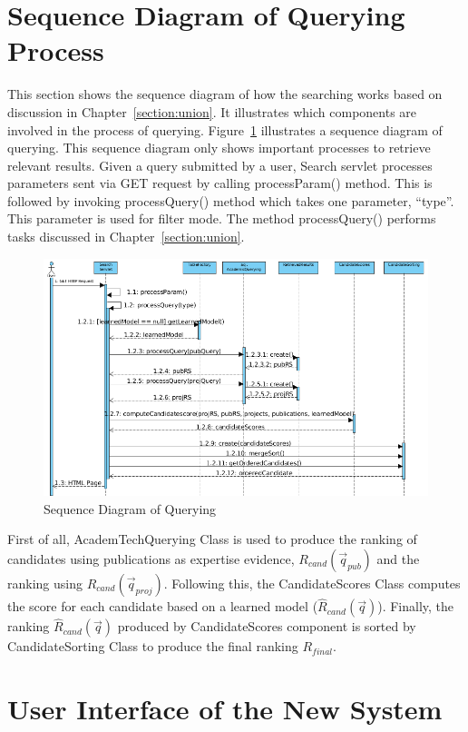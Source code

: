 \section{Sequence Diagram of Querying Process}\label{sec:sequence}
This section shows the sequence diagram of how the searching works based on discussion in Chapter~\ref{section:union}. It illustrates which components are involved in the process of querying. 
Figure~\ref{fig:searchsequence} illustrates a sequence diagram of querying. This sequence diagram only shows important processes to retrieve
relevant results. Given a query submitted by a user, Search servlet processes parameters sent via GET request by calling processParam() method. This is
followed by invoking processQuery() method which takes one parameter, ``type''. This parameter is used for filter mode. The method processQuery() 
performs tasks discussed in Chapter~\ref{section:union}.
\begin{figure}
\centering
\includegraphics[scale=0.4]{./figures/searchsequence.png}
\caption{Sequence Diagram of Querying} \label{fig:searchsequence} 
\end{figure}

First of all, AcademTechQuerying Class is used to produce the ranking of candidates using publications as expertise evidence, $R_{cand}(\vec{q}_{pub})$
and the ranking using $R_{cand}(\vec{q}_{proj})$. Following this, the CandidateScores Class computes the score for each candidate based on a 
learned model ($\hat{R}_{cand}(\vec{q})$). Finally, the ranking $\hat{R}_{cand}(\vec{q})$ produced by CandidateScores component
is sorted by CandidateSorting Class to produce the final ranking $R_{final}$.


\section{User Interface of the New System}\label{sec:newui}

